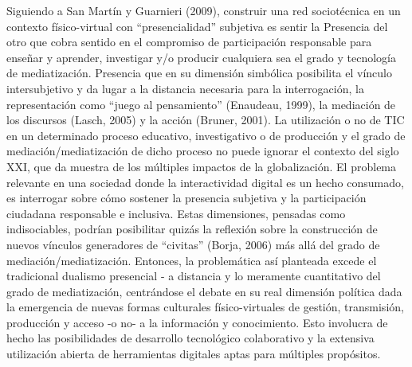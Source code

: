 Siguiendo a San Martín y Guarnieri (2009), construir una red sociotécnica en un contexto físico-virtual con 
“presencialidad” subjetiva es sentir la Presencia del otro que cobra sentido
en el compromiso de participación responsable para enseñar y aprender,
investigar y/o   producir  cualquiera    sea   el   grado    y   tecnología
de mediatización. Presencia que en su dimensión simbólica posibilita el vínculo 
intersubjetivo y da lugar a la distancia necesaria para la interrogación,
la representación como “juego al pensamiento” (Enaudeau, 1999), la mediación de
los  discursos (Lasch, 2005) y la acción (Bruner, 2001). La utilización o no de TIC en un determinado proceso educativo, investigativo
o de producción y el grado de mediación/mediatización de dicho proceso no puede 
ignorar el contexto del siglo XXI, que da muestra de los múltiples impactos de
la globalización. El problema relevante en una sociedad donde la interactividad
digital es un hecho consumado, es interrogar sobre cómo sostener la presencia
subjetiva y la participación ciudadana responsable e inclusiva. Estas  
dimensiones, pensadas como indisociables, podrían posibilitar quizás la
reflexión sobre la construcción de nuevos vínculos generadores de “civitas”
(Borja, 2006) más allá del grado de mediación/mediatización. Entonces, la problemática así planteada excede el tradicional dualismo
presencial - a distancia y lo meramente cuantitativo del grado de mediatización,
centrándose el debate en su real dimensión política dada la emergencia de nuevas
formas culturales físico-virtuales de gestión, transmisión, producción y acceso
-o no- a la información y conocimiento. Esto involucra de hecho las
posibilidades de desarrollo tecnológico colaborativo y la extensiva utilización
abierta de herramientas digitales aptas para múltiples propósitos.

